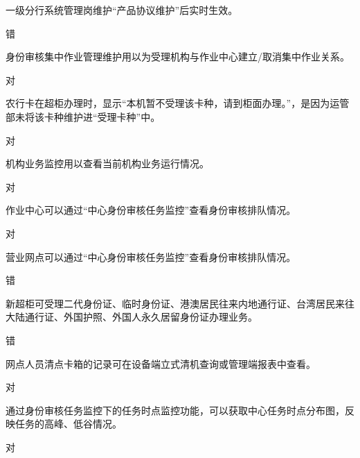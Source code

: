 \documentclass[kindlepaper]{BHCexam4kindle}
\begin{document}
\begin{questions}
\qs 一级分行系统管理岗维护“产品协议维护”后实时生效。 \xx
\begin{solution} 错 \end{solution}
\qs 身份审核集中作业管理维护用以为受理机构与作业中心建立/取消集中作业关系。 \xx
\begin{solution} 对 \end{solution}
\qs 农行卡在超柜办理时，显示“本机暂不受理该卡种，请到柜面办理。”，是因为运管部未将该卡种维护进“受理卡种”中。 \xx
\begin{solution} 对 \end{solution}
\qs 机构业务监控用以查看当前机构业务运行情况。 \xx
\begin{solution} 对 \end{solution}
\qs 作业中心可以通过“中心身份审核任务监控”查看身份审核排队情况。 \xx
\begin{solution} 对 \end{solution}
\qs 营业网点可以通过“中心身份审核任务监控”查看身份审核排队情况。 \xx
\begin{solution} 错 \end{solution}
\qs 新超柜可受理二代身份证、临时身份证、港澳居民往来内地通行证、台湾居民来往大陆通行证、外国护照、外国人永久居留身份证办理业务。 \xx
\begin{solution} 错 \end{solution}
\qs 网点人员清点卡箱的记录可在设备端立式清机查询或管理端报表中查看。 \xx
\begin{solution} 对 \end{solution}
\qs 通过身份审核任务监控下的任务时点监控功能，可以获取中心任务时点分布图，反映任务的高峰、低谷情况。 \xx
\begin{solution} 对 \end{solution}

\end{questions}
\end{document}
